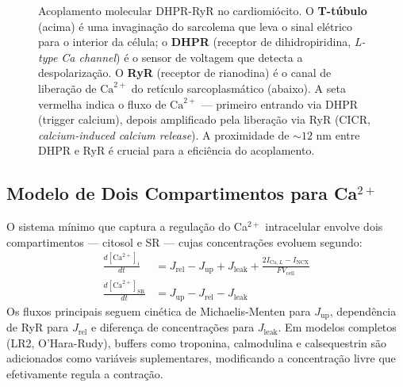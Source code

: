 \begin{figure}[htbp]
\centering
{}
\caption{Acoplamento molecular DHPR-RyR no cardiomiócito. O \textbf{T-túbulo} (acima) é uma invaginação do sarcolema que leva o sinal elétrico para o interior da célula; o \textbf{DHPR} (receptor de dihidropiridina, \emph{L-type Ca channel}) é o sensor de voltagem que detecta a despolarização. O \textbf{RyR} (receptor de rianodina) é o canal de liberação de $\mathrm{Ca}^{2+}$ do retículo sarcoplasmático (abaixo). A seta vermelha indica o fluxo de $\mathrm{Ca}^{2+}$ --- primeiro entrando via DHPR (trigger calcium), depois amplificado pela liberação via RyR (CICR, \emph{calcium-induced calcium release}). A proximidade de $\sim 12$ nm entre DHPR e RyR é crucial para a eficiência do acoplamento.}
\label{fig:12-ttub-rsr}
\end{figure}

\subsection{Modelo de Dois Compartimentos para Ca$^{2+}$}
\label{sub:image12-ca-modelo}

O sistema mínimo que captura a regulação do Ca$^{2+}$ intracelular
envolve dois compartimentos --- citosol e SR --- cujas concentrações
evoluem segundo:
\begin{align}
\frac{d[\mathrm{Ca}^{2+}]_i}{dt} &= J_{\mathrm{rel}} - J_{\mathrm{up}} + J_{\mathrm{leak}} + \frac{2I_{\mathrm{Ca},L} - I_{\mathrm{NCX}}}{F V_{\mathrm{cell}}} \\
\frac{d[\mathrm{Ca}^{2+}]_{\mathrm{SR}}}{dt} &= J_{\mathrm{up}} - J_{\mathrm{rel}} - J_{\mathrm{leak}}
\end{align}
Os fluxos principais seguem cinética de Michaelis-Menten para
$J_{\mathrm{up}}$, dependência de RyR para $J_{\mathrm{rel}}$ e diferença
de concentrações para $J_{\mathrm{leak}}$. Em modelos completos (LR2,
O'Hara-Rudy), buffers como troponina, calmodulina e calsequestrin são
adicionados como variáveis suplementares, modificando a concentração
livre que efetivamente regula a contração.

